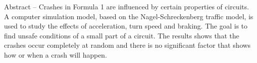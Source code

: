 Abstract -- Crashes in Formula 1 are influenced by certain properties of circuits. A computer simulation model, based on the Nagel-Schreckenberg traffic model, is used to study the effects of acceleration, turn speed and braking. The goal is to find unsafe conditions of a small part of a circuit. The results shows that the crashes occur completely at random and there is no significant factor that shows how or when a crash will happen.